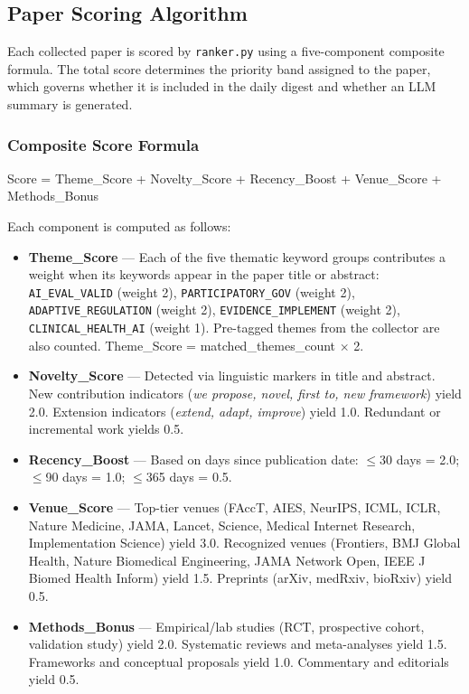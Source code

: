 
\subsection{Paper Scoring Algorithm}
\label{sec:app_scoring}

Each collected paper is scored by \texttt{ranker.py} using a five-component
composite formula. The total score determines the priority band assigned to
the paper, which governs whether it is included in the daily digest and whether
an LLM summary is generated.

\subsubsection{Composite Score Formula}

{\centering
Score = Theme\_Score + Novelty\_Score + Recency\_Boost + Venue\_Score + Methods\_Bonus
\par}

Each component is computed as follows:

\begin{itemize}
\item \textbf{Theme\_Score} — Each of the five thematic keyword groups
  contributes a weight when its keywords appear in the paper title or abstract:
  \texttt{AI\_EVAL\_VALID} (weight 2), \texttt{PARTICIPATORY\_GOV} (weight 2),
  \texttt{ADAPTIVE\_REGULATION} (weight 2), \texttt{EVIDENCE\_IMPLEMENT}
  (weight 2), \texttt{CLINICAL\_HEALTH\_AI} (weight 1). Pre-tagged themes from
  the collector are also counted. Theme\_Score = matched\_themes\_count $\times$ 2.

\item \textbf{Novelty\_Score} — Detected via linguistic markers in title and
  abstract. New contribution indicators (\textit{we propose, novel, first to,
  new framework}) yield 2.0. Extension indicators (\textit{extend, adapt,
  improve}) yield 1.0. Redundant or incremental work yields 0.5.

\item \textbf{Recency\_Boost} — Based on days since publication date:
  $\leq$30 days = 2.0; $\leq$90 days = 1.0; $\leq$365 days = 0.5.

\item \textbf{Venue\_Score} — Top-tier venues (FAccT, AIES, NeurIPS, ICML,
  ICLR, Nature Medicine, JAMA, Lancet, Science, Medical Internet Research,
  Implementation Science) yield 3.0. Recognized venues (Frontiers, BMJ Global
  Health, Nature Biomedical Engineering, JAMA Network Open, IEEE J Biomed
  Health Inform) yield 1.5. Preprints (arXiv, medRxiv, bioRxiv) yield 0.5.

\item \textbf{Methods\_Bonus} — Empirical/lab studies (RCT, prospective cohort,
  validation study) yield 2.0. Systematic reviews and meta-analyses yield 1.5.
  Frameworks and conceptual proposals yield 1.0. Commentary and editorials
  yield 0.5.
\end{itemize}

